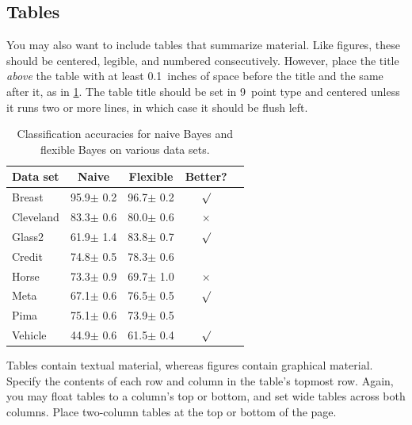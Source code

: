 \documentclass{article}
\theoremstyle{plain}
\theoremstyle{definition}
\theoremstyle{remark}
\begin{document}
    \subsection{Tables}
    
    You may also want to include tables that summarize material. Like
    figures, these should be centered, legible, and numbered consecutively.
    However, place the title \emph{above} the table with at least
    0.1~inches of space before the title and the same after it, as in
    \cref{sample-table}. The table title should be set in 9~point
    type and centered unless it runs two or more lines, in which case it
    should be flush left.
    
    
    \begin{table}[t]
    \caption{Classification accuracies for naive Bayes and flexible
    Bayes on various data sets.}
    \label{sample-table}
    \vskip 0.15in
    \begin{center}
    \begin{small}
    \begin{sc}
    \begin{tabular}{lcccr}
    \toprule
    Data set & Naive & Flexible & Better? \\
    \midrule
    Breast    & 95.9$\pm$ 0.2& 96.7$\pm$ 0.2& $\surd$ \\
    Cleveland & 83.3$\pm$ 0.6& 80.0$\pm$ 0.6& $\times$\\
    Glass2    & 61.9$\pm$ 1.4& 83.8$\pm$ 0.7& $\surd$ \\
    Credit    & 74.8$\pm$ 0.5& 78.3$\pm$ 0.6&         \\
    Horse     & 73.3$\pm$ 0.9& 69.7$\pm$ 1.0& $\times$\\
    Meta      & 67.1$\pm$ 0.6& 76.5$\pm$ 0.5& $\surd$ \\
    Pima      & 75.1$\pm$ 0.6& 73.9$\pm$ 0.5&         \\
    Vehicle   & 44.9$\pm$ 0.6& 61.5$\pm$ 0.4& $\surd$ \\
    \bottomrule
    \end{tabular}
    \end{sc}
    \end{small}
    \end{center}
    \vskip -0.1in
    \end{table}
    
    Tables contain textual material, whereas figures contain graphical material.
    Specify the contents of each row and column in the table's topmost
    row. Again, you may float tables to a column's top or bottom, and set
    wide tables across both columns. Place two-column tables at the
    top or bottom of the page.
    
\end{document}
